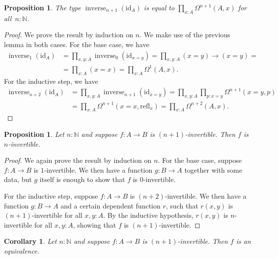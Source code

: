 \documentclass{article}
\theoremstyle{plain}
\newtheorem{proposition}[theorem]{Proposition}
\newtheorem{corollary}[theorem]{Corollary}
\theoremstyle{definition}
\theoremstyle{remark}
\newcommand{\id}{\mathrm{id}}
\newcommand{\refl}{\mathrm{refl}}
\newcommand{\N}{\mathbb{N}}
\newcommand{\lspace}[1]{\Omega^{#1}}
\DeclareMathOperator{\inverse}{inverse}
\newcommand{\ninverse}[1]{\inverse_{#1}}
\begin{document}
\begin{proposition}
  The type \(\ninverse{n + 1}(\id_{A})\) is equal to \(\prod_{x : A}\lspace{n + 1}(A, x)\)
  for all~\(n : \N\).
\end{proposition}

\begin{proof}
  We prove the result by induction on \(n\). We make use of the previous lemma in both cases.
  For the base case, we have
  \begin{align*}
    \ninverse{1}(\id_{A}) &= \prod_{x, y : A}\ninverse{0}(\id_{x = y}) =
                              \prod_{x, y : A} (x = y) \to (x = y) = \\
                            &= \prod_{x : A} (x = x) = \prod_{x : A} \lspace{1}(A, x).
  \end{align*}
  For the inductive step, we have
  \begin{align*}
    \ninverse{n + 2}{(\id_{A})} &= \prod_{x, y : A}\ninverse{n + 1}(\id_{x = y}) =
                                  \prod_{x, y : A}\prod_{p : x = y}\lspace{n + 1}(x = y, p) \\
                                &= \prod_{x : A} \lspace{n + 1}(x = x, \refl_{x}) =
                                  \prod_{x : A}\lspace{n + 2}(A, x).
  \end{align*}
\end{proof}

\begin{proposition}
  Let \(n : \N\) and suppose \(f : A \to B\) is \((n + 1)\)-invertible.
  Then \(f\) is \(n\)-invertible.
\end{proposition}

\begin{proof}
  We again prove the result by induction on \(n\). For the base case, suppose \(f : A \to B\)
  is \(1\)-invertible. We then have a function \(g : B \to A\) together with some data,
  but \(g\) itself is enough to show that \(f\) is \(0\)-invertible.

  For the inductive step,
  suppose \(f : A \to B\) is \((n + 2)\)-invertible. We then have a function
  \(g : B \to A\) and a certain dependent function \(r\), such that \(r(x, y)\) is
  \((n + 1)\)-invertible for all \(x, y : A\). By the inductive hypothesis, \(r(x, y)\) is
  \(n\)-invertible for all \(x, y : A\), showing that \(f\) is \((n + 1)\)-invertible.
\end{proof}

\begin{corollary}
  Let \(n : \N\) and suppose \(f : A \to B\) is \((n + 1)\)-invertible. Then \(f\) is an
  equivalence.
\end{corollary}
\end{document}
